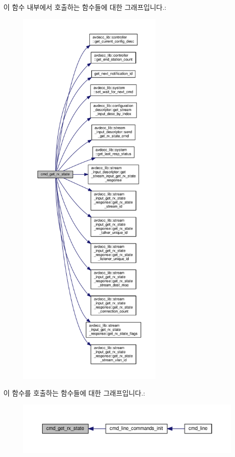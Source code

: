 이 함수 내부에서 호출하는 함수들에 대한 그래프입니다.\+:
\nopagebreak
\begin{figure}[H]
\begin{center}
\leavevmode
\includegraphics[height=550pt]{classcmd__line_a68e20645ab1852e7cf7898896e0359ad_cgraph}
\end{center}
\end{figure}




이 함수를 호출하는 함수들에 대한 그래프입니다.\+:
\nopagebreak
\begin{figure}[H]
\begin{center}
\leavevmode
\includegraphics[width=350pt]{classcmd__line_a68e20645ab1852e7cf7898896e0359ad_icgraph}
\end{center}
\end{figure}



